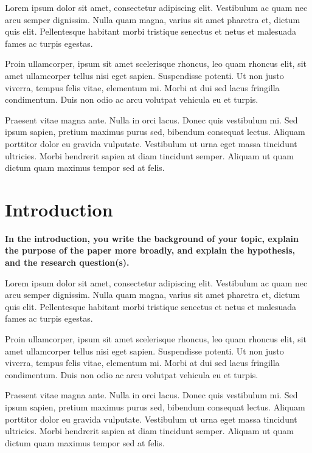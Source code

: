 \documentclass[12pt,a4paper]{report}
\begin{document}
\begin{gbox}
Lorem ipsum dolor sit amet, consectetur adipiscing elit. Vestibulum ac quam nec arcu semper dignissim. Nulla quam magna, varius sit amet pharetra et, dictum quis elit. Pellentesque habitant morbi tristique senectus et netus et malesuada fames ac turpis egestas.
\end{gbox}

\begin{gbox}
Proin ullamcorper, ipsum sit amet scelerisque rhoncus, leo quam rhoncus elit, sit amet ullamcorper tellus nisi eget sapien. Suspendisse potenti. Ut non justo viverra, tempus felis vitae, elementum mi. Morbi at dui sed lacus fringilla condimentum. Duis non odio ac arcu volutpat vehicula eu et turpis.
\end{gbox}

\begin{gbox}
Praesent vitae magna ante. Nulla in orci lacus. Donec quis vestibulum mi. Sed ipsum sapien, pretium maximus purus sed, bibendum consequat lectus. Aliquam porttitor dolor eu gravida vulputate. Vestibulum ut urna eget massa tincidunt ultricies. Morbi hendrerit sapien at diam tincidunt semper. Aliquam ut quam dictum quam maximus tempor sed at felis.
\end{gbox}

\section{Introduction}

\textbf{
In the introduction, you write the background of your topic, explain the purpose of the paper more broadly, and explain the hypothesis, and the research question(s).}

Lorem ipsum dolor sit amet, consectetur adipiscing elit. Vestibulum ac quam nec arcu semper dignissim. Nulla quam magna, varius sit amet pharetra et, dictum quis elit. Pellentesque habitant morbi tristique senectus et netus et malesuada fames ac turpis egestas.

Proin ullamcorper, ipsum sit amet scelerisque rhoncus, leo quam rhoncus elit, sit amet ullamcorper tellus nisi eget sapien. Suspendisse potenti. Ut non justo viverra, tempus felis vitae, elementum mi. Morbi at dui sed lacus fringilla condimentum. Duis non odio ac arcu volutpat vehicula eu et turpis.

Praesent vitae magna ante. Nulla in orci lacus. Donec quis vestibulum mi. Sed ipsum sapien, pretium maximus purus sed, bibendum consequat lectus. Aliquam porttitor dolor eu gravida vulputate. Vestibulum ut urna eget massa tincidunt ultricies. Morbi hendrerit sapien at diam tincidunt semper. Aliquam ut quam dictum quam maximus tempor sed at felis.
\end{document}
